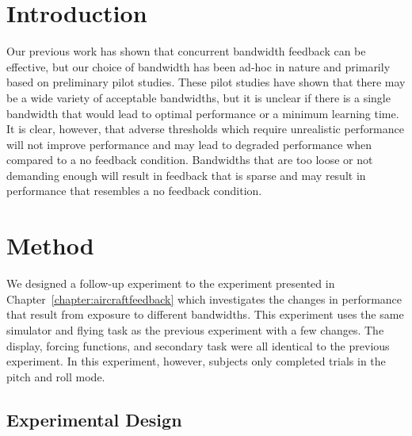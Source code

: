 \section{Introduction}

Our previous work has shown that concurrent bandwidth feedback can be effective, but our choice of bandwidth has been ad-hoc in nature and primarily based on preliminary pilot studies.
These pilot studies have shown that there may be a wide variety of acceptable bandwidths, but it is unclear if there is a single bandwidth that would lead to optimal performance or a minimum learning time.
It is clear, however, that adverse thresholds which require unrealistic performance will not improve performance and may lead to degraded performance when compared to a no feedback condition.
Bandwidths that are too loose or not demanding enough will result in feedback that is sparse and may result in performance that resembles a no feedback condition.

\section{Method}

We designed a follow-up experiment to the experiment presented in Chapter~\ref{chapter:aircraftfeedback} which investigates the changes in performance that result from exposure to different bandwidths.
This experiment uses the same simulator and flying task as the previous experiment with a few changes.
The display, forcing functions, and secondary task were all identical to the previous experiment.
In this experiment, however, subjects only completed trials in the pitch and roll mode.

\subsection{Experimental Design}

